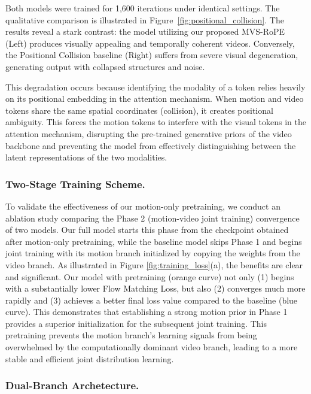 {Both models were trained for 1,600 iterations under identical settings. The qualitative comparison is illustrated in Figure~\ref{fig:positional_collision}. The results reveal a stark contrast: the model utilizing our proposed MVS-RoPE (Left) produces visually appealing and temporally coherent videos. Conversely, the Positional Collision baseline (Right) suffers from severe visual degeneration, generating output with collapsed structures and noise. 

This degradation occurs because identifying the modality of a token relies heavily on its positional embedding in the attention mechanism. When motion and video tokens share the same spatial coordinates (collision), it creates positional ambiguity. This forces the motion tokens to interfere with the visual tokens in the attention mechanism, disrupting the pre-trained generative priors of the video backbone and preventing the model from effectively distinguishing between the latent representations of the two modalities.




\subsubsection{Two-Stage Training Scheme.}

To validate the effectiveness of our motion-only pretraining, we conduct an ablation study comparing the Phase 2 (motion-video joint training) convergence of two models. Our full model starts this phase from the checkpoint obtained after motion-only pretraining, while the baseline model skips Phase 1 and begins joint training with its motion branch initialized by copying the weights from the video branch. As illustrated in Figure \ref{fig:training_loss}(a), the benefits are clear and significant. Our model with pretraining (orange curve) not only (1) begins with a substantially lower Flow Matching Loss, but also (2) converges much more rapidly and (3) achieves a better final loss value compared to the baseline (blue curve). This demonstrates that establishing a strong motion prior in Phase 1 provides a superior initialization for the subsequent joint training. This pretraining prevents the motion branch's learning signals from being overwhelmed by the computationally dominant video branch, leading to a more stable and efficient joint distribution learning.



\subsubsection{Dual-Branch Archetecture.}

}
